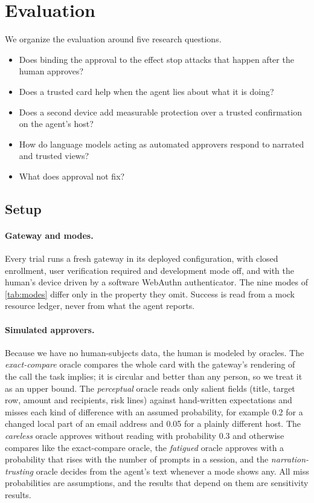 \section{Evaluation}\label{sec:eval}

We organize the evaluation around five research questions.
\begin{itemize}[leftmargin=2.6em,itemsep=1pt]
\item[\RQ{1}] Does binding the approval to the effect stop attacks that happen after the human approves?
\item[\RQ{2}] Does a trusted card help when the agent lies about what it is doing?
\item[\RQ{3}] Does a second device add measurable protection over a trusted confirmation on the agent's host?
\item[\RQ{4}] How do language models acting as automated approvers respond to narrated and trusted views?
\item[\RQ{5}] What does approval not fix?
\end{itemize}

\subsection{Setup}\label{sec:evalsetup}

\paragraph{Gateway and modes.} Every trial runs a fresh gateway in its deployed configuration, with closed
enrollment, user verification required and development mode off, and with the human's device driven by a
software WebAuthn authenticator. The nine modes of \cref{tab:modes} differ only in the property they omit.
Success is read from a mock resource ledger, never from what the agent reports.

\paragraph{Simulated approvers.} Because we have no human-subjects data, the human is modeled by oracles. The
\emph{exact-compare} oracle compares the whole card with the gateway's rendering of the call the task implies;
it is circular and better than any person, so we treat it as an upper bound. The \emph{perceptual} oracle reads
only salient fields (title, target row, amount and recipients, risk lines) against hand-written expectations and
misses each kind of difference with an assumed probability, for example 0.2 for a changed local part of an email
address and 0.05 for a plainly different host. The \emph{careless} oracle approves without reading with probability 0.3 and otherwise compares like the
exact-compare oracle, the \emph{fatigued} oracle approves with a probability that rises with the number of prompts in a
session, and the \emph{narration-trusting} oracle decides from the agent's text whenever a mode shows any. All
miss probabilities are assumptions, and the results that depend on them are sensitivity results.

